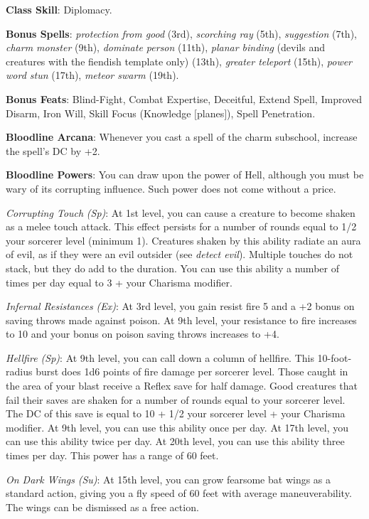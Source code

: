 \textbf{Class Skill}: Diplomacy.
				
\textbf{Bonus Spells}: \textit{protection from good} (3rd), \textit{scorching ray} (5th), \textit{suggestion} (7th), \textit{charm monster} (9th), \textit{dominate person }(11th), \textit{planar binding} (devils and creatures with the fiendish template only) (13th), \textit{greater teleport} (15th), \textit{power word stun} (17th), \textit{meteor swarm} (19th).
				
\textbf{Bonus Feats}: Blind-Fight, Combat Expertise, Deceitful, Extend Spell, Improved Disarm, Iron Will, Skill Focus (Knowledge \mbox{$[$}planes\mbox{$]$}), Spell Penetration.
				
\textbf{Bloodline Arcana}: Whenever you cast a spell of the charm subschool, increase the spell's DC by +2.
				
\textbf{Bloodline Powers}: You can draw upon the power of Hell, although you must be wary of its corrupting influence. Such power does not come without a price.
				
\textit{Corrupting Touch} \textit{(Sp)}: At 1st level, you can cause a creature to become shaken as a melee touch attack. This effect persists for a number of rounds equal to 1/2 your sorcerer level (minimum 1). Creatures shaken by this ability radiate an aura of evil, as if they were an evil outsider (see \textit{detect evil}). Multiple touches do not stack, but they do add to the duration. You can use this ability a number of times per day equal to 3 + your Charisma modifier.
				
\textit{Infernal Resistances} \textit{(Ex)}: At 3rd level, you gain resist fire 5 and a +2 bonus on saving throws made against poison. At 9th level, your resistance to fire increases to 10 and your bonus on poison saving throws increases to +4.
				
\textit{Hellfire (Sp)}: At 9th level, you can call down a column of hellfire. This 10-foot-radius burst does 1d6 points of fire damage per sorcerer level. Those caught in the area of your blast receive a Reflex save for half damage. Good creatures that fail their saves are shaken for a number of rounds equal to your sorcerer level. The DC of this save is equal to 10 + 1/2 your sorcerer level + your Charisma modifier. At 9th level, you can use this ability once per day. At 17th level, you can use this ability twice per day. At 20th level, you can use this ability three times per day. This power has a range of 60 feet.
				
\textit{On Dark Wings} \textit{(Su)}: At 15th level, you can grow fearsome bat wings as a standard action, giving you a fly speed of 60 feet with average maneuverability. The wings can be dismissed as a free action.
				

